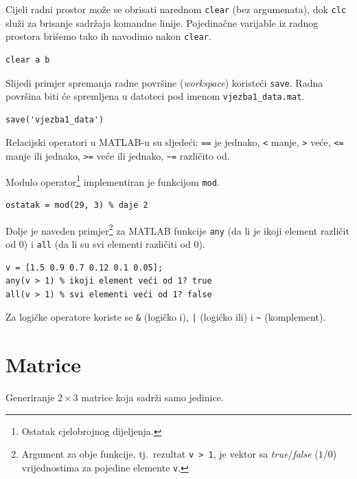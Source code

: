 \documentclass[a4paper, 10pt]{article}
\newcommand{\spec}[1]{\texttt{#1}} %
\newcommand{\eng}[1]{\emph{#1}} %
\begin{document}
Cijeli radni prostor može se obrisati narednom \spec{clear} (bez argumenata), dok \spec{clc} služi za brisanje sadržaja komandne linije.
Pojedinačne varijable iz radnog prostora brišemo tako ih navodimo nakon \spec{clear}.

\begin{lstlisting}
clear a b
\end{lstlisting}
Slijedi primjer spremanja radne površine (\eng{workspace}) koristeći \spec{save}. Radna površina biti će spremljena u datoteci pod imenom \spec{vjezba1\_data.mat}.

\begin{lstlisting}
save('vjezba1_data')
\end{lstlisting}

Relacijski operatori u MATLAB-u su sljedeći: \spec{==} je jednako, \spec{<} manje, \spec{>} veće, \spec{<=} manje ili jednako, \spec{>=} veće ili jednako, \spec{\textasciitilde=} različito od.

Modulo operator\footnote{Ostatak cjelobrojnog dijeljenja.} implementiran je funkcijom \spec{mod}.

\begin{lstlisting}
ostatak = mod(29, 3) % daje 2
\end{lstlisting}

Dolje je naveden primjer\footnote{Argument za obje funkcije, tj.\ rezultat \spec{v > 1}, je vektor sa \eng{true}/\eng{false} ($1$/$0$) vrijednostima za pojedine elemente \spec{v}.}
za MATLAB funkcije \spec{any} (da li je ikoji element različit od $0$) i \spec{all} (da li su svi elementi različiti od $0$).

\begin{lstlisting}
v = [1.5 0.9 0.7 0.12 0.1 0.05];
any(v > 1) % ikoji element veći od 1? true
all(v > 1) % svi elementi veći od 1? false
\end{lstlisting}

Za logičke operatore koriste se \spec{\&} (logičko i), \spec{|} (logičko ili) i \spec{\textasciitilde} (komplement).


\section{Matrice}
\label{sec:matrice}

Generiranje $2 \times 3$ matrice koja sadrži samo jedinice.
\end{document}
